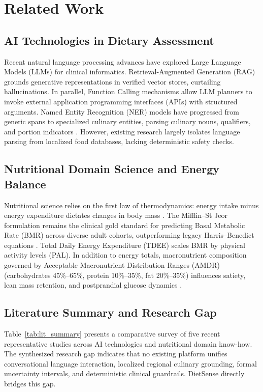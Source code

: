 \documentclass[conference]{IEEEtran}
\begin{document}
\section{Related Work}

\subsection{AI Technologies in Dietary Assessment}
Recent natural language processing advances have explored Large Language Models (LLMs) for clinical informatics. Retrieval-Augmented Generation (RAG) grounds generative representations in verified vector stores, curtailing hallucinations. In parallel, Function Calling mechanisms allow LLM planners to invoke external application programming interfaces (APIs) with structured arguments. Named Entity Recognition (NER) models have progressed from generic spans to specialized culinary entities, parsing culinary nouns, qualifiers, and portion indicators \cite{cheng2024can}. However, existing research largely isolates language parsing from localized food databases, lacking deterministic safety checks.

\subsection{Nutritional Domain Science and Energy Balance}
Nutritional science relies on the first law of thermodynamics: energy intake minus energy expenditure dictates changes in body mass \cite{hall2012quantification}. The Mifflin--St Jeor formulation remains the clinical gold standard for predicting Basal Metabolic Rate (BMR) across diverse adult cohorts, outperforming legacy Harris--Benedict equations \cite{mifflin1990new}. Total Daily Energy Expenditure (TDEE) scales BMR by physical activity levels (PAL). In addition to energy totals, macronutrient composition governed by Acceptable Macronutrient Distribution Ranges (AMDR) (carbohydrates 45\%--65\%, protein 10\%--35\%, fat 20\%--35\%) influences satiety, lean mass retention, and postprandial glucose dynamics \cite{zeevi2015personalized, ludwig2018dietary}.

\subsection{Literature Summary and Research Gap}
Table~\ref{tab:lit_summary} presents a comparative survey of five recent representative studies across AI technologies and nutritional domain know-how. The synthesized research gap indicates that no existing platform unifies conversational language interaction, localized regional culinary grounding, formal uncertainty intervals, and deterministic clinical guardrails. DietSense directly bridges this gap.
\end{document}
